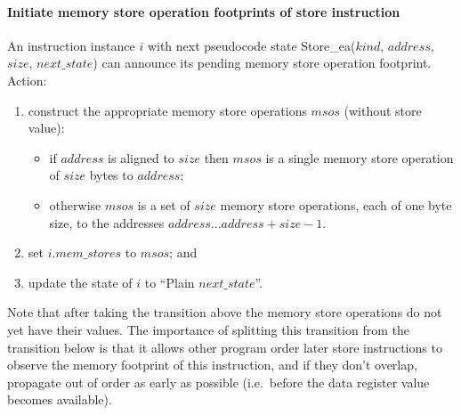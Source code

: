 %

\paragraph{Initiate memory store operation footprints of store instruction}\label{omm:hart:announce_store_footprint}
An instruction instance $i$ with next pseudocode state {\sc Store\_ea}($kind$, $address$, $size$, $next\_state$) can announce its pending memory store operation footprint.
Action:
\begin{enumerate}
\item construct the appropriate memory store operations $msos$ (without store value):
  \begin{itemize}
  \item if $address$ is aligned to $size$ then $msos$ is a single memory store operation of $size$ bytes to $address$;
  \item otherwise $msos$ is a set of $size$ memory store operations, each of one byte size, to the addresses $address\ldots address+size-1$.
  \end{itemize}
\item set $i.mem\_stores$ to $msos$; and
\item update the state of $i$ to ``{\sc Plain} $next\_state$''.
\end{enumerate}

\begin{commentary}
Note that after taking the transition above the memory store operations do not yet have their values.
The importance of splitting this transition from the transition below is that it allows other program order later store instructions to observe the memory footprint of this instruction, and if they don't overlap, propagate out of order as early as possible (i.e.~before the data register value becomes available).
\end{commentary}


